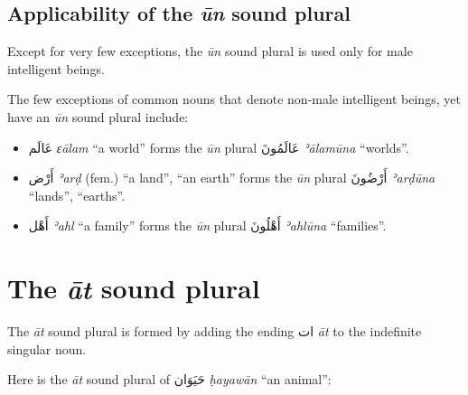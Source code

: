 \documentclass[
  10pt,
]{book}
\providecommand{\tightlist}{%
  \setlength{\itemsep}{0pt}\setlength{\parskip}{0pt}}
\begin{document}
\subsection{\texorpdfstring{Applicability of the \emph{ūn} sound plural}{Applicability of the ūn sound plural}}\label{applicability-of-the-un-sound-plural}

Except for very few exceptions, the \emph{ūn} sound plural is used only for male intelligent beings.

The few exceptions of common nouns that denote non-male intelligent beings, yet have an \emph{ūn} sound plural include:

\begin{itemize}
\tightlist
\item
  \foreignlanguage{arabic}{عَالَم} \emph{ɛālam} \enquote{a world} forms the \emph{ūn} plural \foreignlanguage{arabic}{عَالَمُونَ} \emph{ʾālamūna} \enquote{worlds}.
\item
  \foreignlanguage{arabic}{أَرْض} \emph{ʾarḍ} (fem.) \enquote{a land}, \enquote{an earth} forms the \emph{ūn} plural \foreignlanguage{arabic}{أَرْضُونَ} \emph{ʾarḍūna} \enquote{lands}, \enquote{earths}.
\item
  \foreignlanguage{arabic}{أَهْل} \emph{ʾahl} \enquote{a family} forms the \emph{ūn} plural \foreignlanguage{arabic}{أَهْلُونَ} \emph{ʾahlūna} \enquote{families}.
\end{itemize}

\section{\texorpdfstring{The \emph{āt} sound plural}{The āt sound plural}}\label{the-at-sound-plural}

The \emph{āt} sound plural is formed by adding the ending \foreignlanguage{arabic}{ات} \emph{āt} to the indefinite singular noun.

Here is the \emph{āt} sound plural of \foreignlanguage{arabic}{حَيَوَان} \emph{ḥayawān} \enquote{an animal}:
\end{document}
